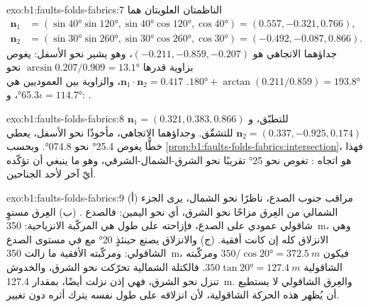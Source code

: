 \begin{solution}{exo:b1:faults-folds-fabrics:7}
الناظمتان العلويتان هما
\begin{align*}
  \mathbf n_1 &= (\sin\ang{40}\sin\ang{120}, \sin\ang{40}\cos\ang{120}, \cos\ang{40}) = (0.557, -0.321, 0.766),\\
  \mathbf n_2 &= (\sin\ang{30}\sin\ang{260}, \sin\ang{30}\cos\ang{260}, \cos\ang{30}) = (-0.492, -0.087, 0.866).
\end{align*}
جداؤهما الاتجاهي هو
$(-0.211, -0.859, -0.207)$، وهو يشير نحو الأسفل: يغوص  بزاوية قدرها
$\arcsin 0.207/0.909 = \ang{13.1}$ نحو $\ang{180} + \arctan(0.211/0.859) =
\ang{193.8}$. $\mathbf n_1\cdot\mathbf n_2 = 0.417$، والزاوية بين العموديين
هي \ang{65.3}، و$\iota = \ang{114.7}$: .
\end{solution}

\begin{solution}{exo:b1:faults-folds-fabrics:8}
$\mathbf n_1 = (0.321, 0.383, 0.866)$ للتطبّق، و
$\mathbf n_2 = (0.337, -0.925, 0.174)$ للتشقّق. وجداؤهما الاتجاهي، مأخوذًا نحو الأسفل، يعطي خطًّا يغوص \ang{25.4} نحو \ang{074.8}. وبحسب
\cref{prop:b1:faults-folds-fabrics:intersection}، فهذا هو اتجاه :  تغوص نحو \ang{25} تقريبًا نحو الشرق-الشمال-الشرقي، وهو ما ينبغي أن تؤكّده أيّ  آخر لأحد الجناحين.
\end{solution}

\begin{solution}{exo:b1:faults-folds-fabrics:9}
(أ) مراقب جنوب الصدع، ناظرًا نحو الشمال، يرى الجزء الشمالي من العِرق مزاحًا نحو الشرق، أي نحو اليمين: فالصدع . (ب) العِرق مستوٍ شاقولي عمودي على الصدع، فإزاحته على طول  هي المركّبة الانزياحية: \qty{350}{m}، وهي الانزلاق كله إن كانت  أفقية. (ج) والانزلاق يصنع حينئذٍ \ang{20} مع  في مستوى الصدع الشاقولي: ومركّبته الأفقية ما زالت \qty{350}{m}، فيكون  $350/\cos\ang{20} = \qty{372.5}{m}$ ومركّبته الشاقولية $350\tan\ang{20} = \qty{127.4}{m}$. فالكتلة الشمالية تحرّكت نحو الشرق، والخدوش تنزل نحو الشرق، فهي إذن نزلت أيضًا، بمقدار \qty{127.4}{m}. والعِرق الشاقولي لا يستطيع أن يُظهر هذه الحركة الشاقولية، لأن انزلاقه على طول نفسه يترك أثره دون تغيير.
\end{solution}


